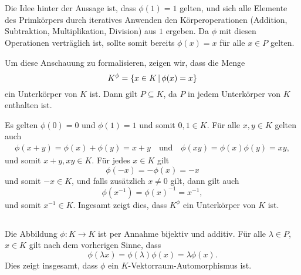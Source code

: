 \section{}





\subsection{}

Die Idee hinter der Aussage ist, dass $\phi(1) = 1$ gelten, und sich alle Elemente des Primkörpers durch iteratives Anwenden den Körperoperationen (Addition, Subtraktion, Multiplikation, Division) aus $1$ ergeben.
Da $\phi$ mit diesen Operationen verträglich ist, sollte somit bereits $\phi(x) = x$ für alle $x \in P$ gelten.

Um diese Anschauung zu formalisieren, zeigen wir, dass die Menge
\[
    K^\phi
  = \{ x \in K \suchthat \phi(x) = x \}
\]
ein Unterkörper von $K$ ist.
Dann gilt $P \subseteq K$, da $P$ in jedem Unterkörper von $K$ enthalten ist.

Es gelten $\phi(0) = 0$ und $\phi(1) = 1$ und somit $0, 1 \in K$.
Für alle $x, y \in K$ gelten auch
\begin{gather*}
    \phi(x+y)
  = \phi(x) + \phi(y)
  = x + y
  \quad\text{und}\quad
    \phi(xy)
  = \phi(x) \phi(y)
  = xy,
\end{gather*}
und somit $x + y, xy \in K$.
Für jedes $x \in K$ gilt
\[
    \phi(-x)
  = -\phi(x)
  = -x
\]
und somit $-x \in K$, und falls zusätzlich $x \neq 0$ gilt, dann gilt auch
\[
    \phi(x^{-1})
  = \phi(x)^{-1}
  = x^{-1},
\]
und somit $x^{-1} \in K$.
Ingesamt zeigt dies, dass $K^\phi$ ein Unterkörper von $K$ ist.





\subsection{}

Die Abbildung $\phi \colon K \to K$ ist per Annahme bijektiv und additiv.
Für alle $\lambda \in P$, $x \in K$ gilt nach dem vorherigen Sinne, dass
\[
    \phi(\lambda x)
  = \phi(\lambda) \phi(x)
  = \lambda \phi(x).
\]
Dies zeigt insgesamt, dass $\phi$ ein $K$-Vektorraum-Automorphismus ist.

